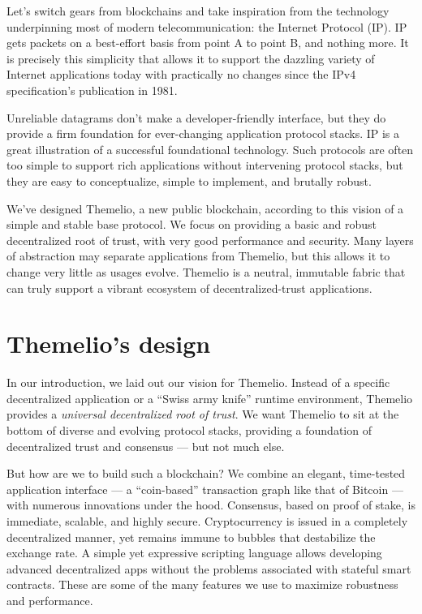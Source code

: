 \documentclass[headinclude]{scrbook}
\begin{document}
Let's switch gears from blockchains and take inspiration from the technology underpinning most of modern telecommunication: the Internet Protocol (IP). IP gets packets on a best-effort basis from point A to point B, and nothing more. It is precisely this simplicity that allows it to support the dazzling variety of Internet applications today with practically no changes since the IPv4 specification's publication in 1981.

Unreliable datagrams don't make a developer-friendly interface, but they do provide a firm foundation for ever-changing application protocol stacks. IP is a great illustration of a successful foundational technology. Such protocols are often too simple to support rich applications without intervening protocol stacks, but they are easy to conceptualize, simple to implement, and brutally robust.

We've designed Themelio, a new public blockchain, according to this vision of a simple and stable base protocol. We focus on providing a basic and robust decentralized root of trust, with very good performance and security. Many layers of abstraction may separate applications from Themelio, but this allows it to change very little as usages evolve. Themelio is a neutral, immutable fabric that can truly support a vibrant ecosystem of decentralized-trust applications.


\chapter{Themelio's design}

In our introduction, we laid out our vision for Themelio. Instead of a specific decentralized application or a ``Swiss army knife'' runtime environment, Themelio provides a \emph{universal decentralized root of trust}. We want Themelio to sit at the bottom of diverse and evolving protocol stacks, providing a foundation of decentralized trust and consensus --- but not much else.

But how are we to build such a blockchain? We combine an elegant, time-tested application interface --- a ``coin-based'' transaction graph like that of Bitcoin --- with numerous innovations under the hood. Consensus, based on proof of stake, is immediate, scalable, and highly secure. Cryptocurrency is issued in a completely decentralized manner, yet remains immune to bubbles that destabilize the exchange rate. A simple yet expressive scripting language allows developing advanced decentralized apps without the problems associated with stateful smart contracts. These are some of the many features we use to maximize robustness and performance.
\end{document}
